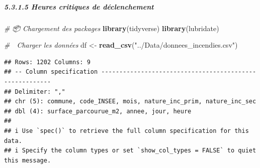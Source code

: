 \documentclass[
]{article}
\newenvironment{Shaded}{\begin{snugshade}}{\end{snugshade}}
\newcommand{\CommentTok}[1]{\textcolor[rgb]{0.56,0.35,0.01}{\textit{#1}}}
\newcommand{\FunctionTok}[1]{\textcolor[rgb]{0.13,0.29,0.53}{\textbf{#1}}}
\newcommand{\NormalTok}[1]{#1}
\newcommand{\OtherTok}[1]{\textcolor[rgb]{0.56,0.35,0.01}{#1}}
\newcommand{\StringTok}[1]{\textcolor[rgb]{0.31,0.60,0.02}{#1}}
\begin{document}
\subparagraph{5.3.1.5 Heures critiques de
déclenchement}\label{heures-critiques-de-duxe9clenchement}

\begin{Shaded}
\begin{Highlighting}[]
\CommentTok{\# 📦 Chargement des packages}
\FunctionTok{library}\NormalTok{(tidyverse)}
\FunctionTok{library}\NormalTok{(lubridate)}

\CommentTok{\# 📂 Charger les données}
\NormalTok{df }\OtherTok{\textless{}{-}} \FunctionTok{read\_csv}\NormalTok{(}\StringTok{"../Data/donnees\_incendies.csv"}\NormalTok{)}
\end{Highlighting}
\end{Shaded}

\begin{verbatim}
## Rows: 1202 Columns: 9
## -- Column specification --------------------------------------------------------
## Delimiter: ","
## chr (5): commune, code_INSEE, mois, nature_inc_prim, nature_inc_sec
## dbl (4): surface_parcourue_m2, annee, jour, heure
## 
## i Use `spec()` to retrieve the full column specification for this data.
## i Specify the column types or set `show_col_types = FALSE` to quiet this message.
\end{verbatim}
\end{document}
